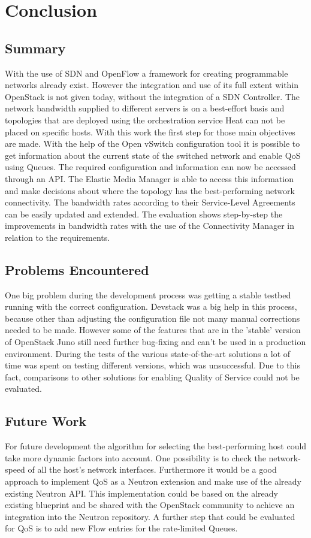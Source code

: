 \cleardoublepage
\chapter{Conclusion}

\section{Summary}

With the use of SDN and OpenFlow a framework for creating programmable networks already exist. However the integration and use of its full extent within OpenStack is not given today, without the integration of a SDN Controller. The network bandwidth supplied to different servers is on a best-effort basis and topologies that are deployed using the orchestration service Heat can not be placed on specific hosts. With this work the first step for those main objectives are made. With the help of the Open vSwitch configuration tool it is possible to get information about the current state of the switched network and enable QoS using Queues. The required configuration and information can now be accessed through an API. The Elastic Media Manager is able to access this information and make decisions about where the topology has the best-performing network connectivity. The bandwidth rates according to their Service-Level Agreements can be easily updated and extended. The evaluation shows step-by-step the improvements in bandwidth rates with the use of the Connectivity Manager in relation to the requirements.

\section{Problems Encountered}

One big problem during the development process was getting a stable testbed running with the correct configuration. Devstack was a big help in this process, because other than adjusting the configuration file not many manual corrections needed to be made. However some of the features that are in the 'stable' version of OpenStack Juno still need further bug-fixing and can't be used in a production environment. During the tests of the various state-of-the-art solutions a lot of time was spent on testing different versions, which was unsuccessful. Due to this fact, comparisons to other solutions for enabling Quality of Service could not be evaluated. 

\section{Future Work}

For future development the algorithm for selecting the best-performing host could take more dynamic factors into account. One possibility is to check the network-speed of all the host's network interfaces. Furthermore it would be a good approach to implement QoS as a Neutron extension and make use of the already existing Neutron API. This implementation could be based on the already existing blueprint and be shared with the OpenStack community to achieve an integration into the Neutron repository. A further step that could be evaluated for QoS is to add new Flow entries for the rate-limited Queues.